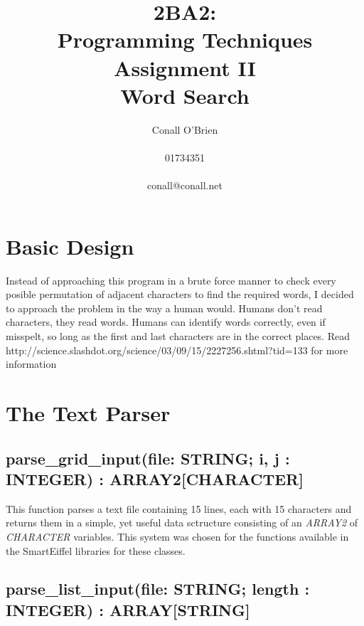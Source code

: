 \documentclass[a4paper,12pt]{article}
\begin{document}
\title{2BA2: \\ Programming Techniques \\ Assignment II \\ Word Search}

\author{Conall O'Brien \\ \\ 01734351 \\ \\ conall@conall.net}

\maketitle

\pagebreak

\section{Basic Design}

\noindent Instead of approaching this program in a brute force manner to
check every posible permutation of adjacent characters to find the
required words, I decided to approach the problem in the way a human
would. Humans don't read characters, they read words. Humans can
identify words correctly, even if misspelt, so long as the first and
last characters are in the correct places. Read
http://science.slashdot.org/science/03/09/15/2227256.shtml?tid=133 for
more information 


\pagebreak

\section{The Text Parser}

\subsection{parse\_grid\_input(file: STRING; i, j : INTEGER) :
ARRAY2[CHARACTER]}

\noindent This function parses a text file containing 15 lines, each
with 15 characters and returns them in a simple, yet useful data
sctructure consisting of an \emph{ARRAY2} of \emph{CHARACTER} variables.
This system was chosen for the functions available in the SmartEiffel
libraries for these classes.

\subsection{parse\_list\_input(file: STRING; length : INTEGER) :
ARRAY[STRING]}
\end{document}
